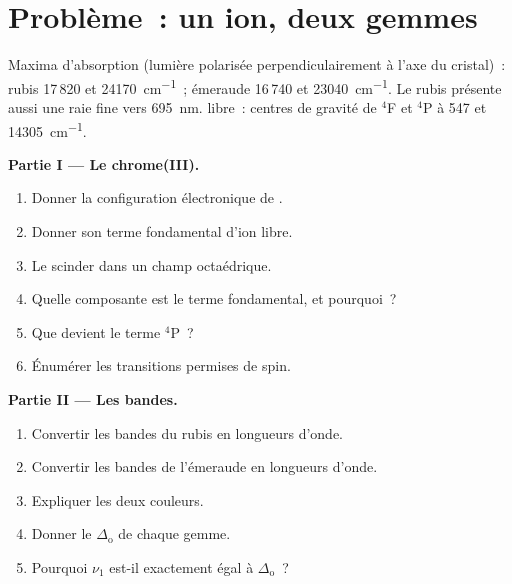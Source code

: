 \section{Problème~: un ion, deux gemmes}

\begin{problem}
\label{pb:b3:complex-spectra-magnetism:1}
Maxima d'absorption (lumière polarisée perpendiculairement à l'axe du
cristal)~: rubis 17\,820 et \qty{24170}{cm^{-1}}~; émeraude 16\,740 et
\qty{23040}{cm^{-1}}. Le rubis présente aussi une raie fine vers
\qty{695}{nm}.  libre~: centres de gravité de $^4$F et $^4$P à 547 et \qty{14305}{cm^{-1}}.

\medskip\noindent\textbf{Partie I --- Le chrome(III).}
\begin{enumerate}
  \item Donner la configuration électronique de .
  \item Donner son terme fondamental d'ion libre.
  \item Le scinder dans un champ octaédrique.
  \item Quelle composante est le terme fondamental, et pourquoi~?
  \item Que devient le terme $^4$P~?
  \item Énumérer les transitions permises de spin.
\end{enumerate}

\medskip\noindent\textbf{Partie II --- Les bandes.}
\begin{enumerate}[resume]
  \item Convertir les bandes du rubis en longueurs d'onde.
  \item Convertir les bandes de l'émeraude en longueurs d'onde.
  \item Expliquer les deux couleurs.
  \item Donner le $\Delta_{\mathrm o}$ de chaque gemme.
  \item Pourquoi $\nu_1$ est-il exactement égal à $\Delta_{\mathrm o}$~?
\end{enumerate}


\end{problem}
